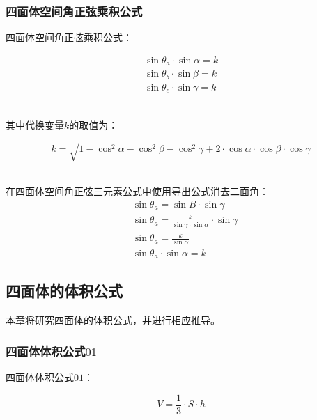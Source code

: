 \documentclass[UTF8]{ctexart}
\begin{document}
\subsubsection{四面体空间角正弦乘积公式}
    四面体空间角正弦乘积公式：
    \begin{large}
        \begin{align*}
            \sin{\theta_a}\cdot\sin{\alpha}=k\\[3mm]
            \sin{\theta_b}\cdot\sin{\beta}=k\\[3mm]
            \sin{\theta_c}\cdot\sin{\gamma}=k
        \end{align*}
    \end{large}\\
    其中代换变量$k$的取值为：\vspace{5pt}
    \begin{large}
        \begin{equation*}
            k=\sqrt{1-\cos^2{\alpha}-\cos^2{\beta}-\cos^2{\gamma}+2\cdot\cos{\alpha}\cdot\cos{\beta}\cdot\cos{\gamma}}
        \end{equation*}
    \end{large}\\[3mm]
    在四面体空间角正弦三元素公式中使用导出公式消去二面角：\vspace{5pt}
    \setcounter{equation}{0}
    \begin{align}
        &\sin{\theta_a}=\sin{B}\cdot\sin{\gamma}\\[3mm]
        &\sin{\theta_a}=\frac{k}{\sin{\gamma}\cdot\sin{\alpha}}\cdot\sin{\gamma}\\[3mm]
        &\sin{\theta_a}=\frac{k}{\sin{\alpha}}\\[3mm]
        &\sin{\theta_a}\cdot\sin{\alpha}=k
    \end{align}

\newpage

\subsection{四面体的体积公式}
    本章将研究四面体的体积公式，并进行相应推导。

\subsubsection{四面体体积公式$01$}
    四面体体积公式$01$：
    \begin{large}
        \begin{equation*}
            V=\frac{1}{3}\cdot S\cdot h
        \end{equation*}
    \end{large}\vspace{-10pt}
\end{document}

